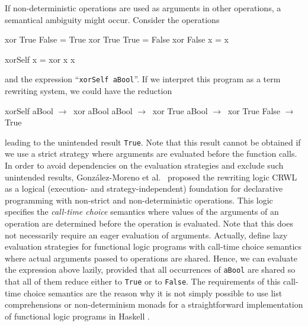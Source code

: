 \documentclass{llncs}
\newcommand{\code}[1]{\mbox{\small\texttt{#1}}}
\newcommand{\ccode}[1]{``\code{#1}''}
\begin{document}
If non-deterministic operations are used as arguments in other operations,
a semantical ambiguity might occur. Consider the operations
%
\begin{curry}
  xor True  False = True
  xor True  True  = False
  xor False x     = x

  xorSelf x = xor x x
\end{curry}
%
and the expression \ccode{xorSelf aBool}.
If we interpret this program as a term rewriting system,
we could have the reduction
\begin{haskell}
  xorSelf aBool  $\to~$  xor aBool aBool     $\to~$  xor True aBool
                 $\to~$  xor True False      $\to~$  True
\end{haskell}
leading to the unintended result \code{True}.
Note that this result cannot be obtained if we use a strict strategy
where arguments are evaluated before the function calls.
In order to avoid dependencies on the evaluation strategies
and exclude such unintended results,
Gonz\'alez-Moreno et al.\ \cite{GonzalezEtAl99} proposed
the rewriting logic CRWL as a logical
(execution- and strategy-independent) foundation for declarative
programming with non-strict and non-deterministic operations.  This
logic specifies the \emph{call-time choice} semantics \cite{Hussmann92}
\label{ctc-semantics}
where values of the arguments of an operation are determined before the
operation is evaluated. Note that this does not necessarily require
an eager evaluation of arguments.
Actually, \cite{AlbertHanusHuchOliverVidal05,LopezRodriguezSanchez07}
define lazy evaluation strategies for functional logic programs
with call-time choice semantics where actual arguments passed to
operations are shared. Hence, we can evaluate the expression above
lazily, provided that all occurrences of \code{aBool}
are shared so that all of them reduce either to \code{True} or to \code{False}.
The requirements of this call-time choice semantics are the
reason why it is not simply possible to use list comprehensions
or non-determinism monads for a straightforward implementation
of functional logic programs in Haskell \cite{FischerKiselyovShan09}.
\end{document}
